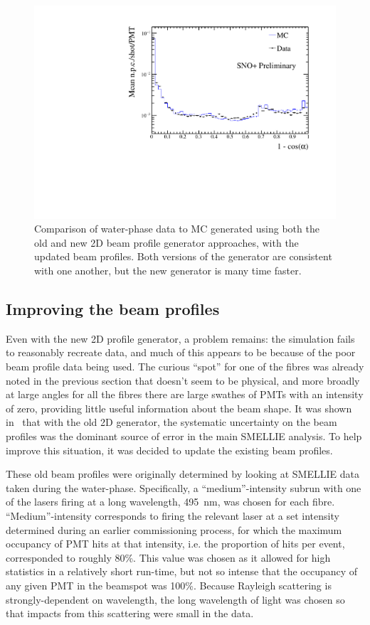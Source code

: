 \begin{figure}
    \centering
    \includegraphics[width=\linewidth]{5_SMELLIESimulation/images/data_mc_comparison_npe_vs_r_114018_109_use_f.pdf}
    \caption{Comparison of water-phase data to MC generated using both the old and new 2D beam profile generator approaches, with the updated beam profiles. Both versions of the generator are consistent with one another, but the new generator is many time faster.}
    \label{fig:data_generator_comp_new_profiles}
\end{figure}

\subsection{Improving the beam profiles}\label{sect:new_beam_profiles}
Even with the new 2D profile generator, a problem remains: the simulation fails to reasonably recreate data, and much of this appears to be because of the poor beam profile data being used. The curious ``spot'' for one of the fibres was already noted in the previous section that doesn't seem to be physical, and more broadly at large angles for all the fibres there are large swathes of PMTs with an intensity of zero, providing little useful information about the beam shape. It was shown in~\cite{turner_measurement_nodate} that with the old 2D generator, the systematic uncertainty on the beam profiles was the dominant source of error in the main SMELLIE analysis. To help improve this situation, it was decided to update the existing beam profiles.

These old beam profiles were originally determined by looking at SMELLIE data taken during the water-phase. Specifically, a ``medium''-intensity subrun with one of the lasers firing at a long wavelength, \SI{495}{\nano\metre}, was chosen for each fibre. ``Medium''-intensity corresponds to firing the relevant laser at a set intensity determined during an earlier commissioning process, for which the maximum occupancy of PMT hits at that intensity, i.e. the proportion of hits per event, corresponded to roughly 80\%. This value was chosen as it allowed for high statistics in a relatively short run-time, but not so intense that the occupancy of any given PMT in the beamspot was 100\%. Because Rayleigh scattering is strongly-dependent on wavelength, the long wavelength of light was chosen so that impacts from this scattering were small in the data.

